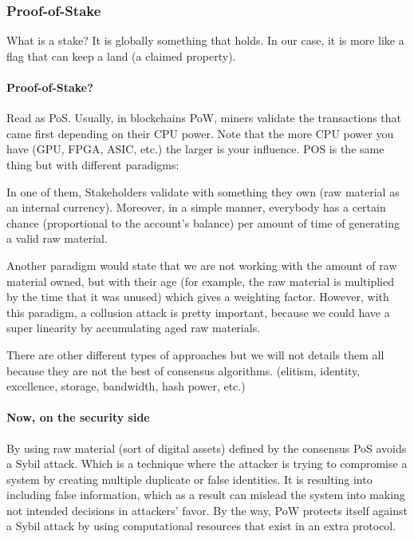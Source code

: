 \subsubsection{Proof-of-Stake}
What is a stake? It is globally something that holds. In our case, it is more like a flag that can keep a land (a claimed property).

\paragraph{Proof-of-Stake?\cite{King2012PPCoin:Proof-of-Stake}}
Read as PoS. Usually, in blockchains PoW, miners validate the transactions that came first depending on their CPU power. Note that the more CPU power you have (GPU, FPGA, ASIC, etc.) the larger is your influence. POS is the same thing but with different paradigms:

In one of them, Stakeholders validate with something they own (raw material as an internal currency). Moreover, in a simple manner, everybody has a certain chance (proportional to the account’s balance) per amount of time of generating a valid raw material.

Another paradigm would state that we are not working with the amount of raw material owned, but with their age (for example, the raw material is multiplied by the time that it was unused) which gives a weighting factor. However, with this paradigm, a collusion attack is pretty important, because we could have a super linearity by accumulating aged raw materials.

There are other different types of approaches but we will not details them all because they are not the best of consensus algorithms. (elitism, identity, excellence, storage, bandwidth, hash power, etc.)

\paragraph{Now, on the security side} By using raw material (sort of digital assets) defined by the consensus PoS avoids a Sybil\cite{G.LawrencePaulSundararaj1D.R.AnitaSofiaLiz22014Anti-SybilNetworks} attack. Which is a technique where the attacker is trying to compromise a system by creating multiple duplicate or false identities. It is resulting into including false information, which as a result can mislead the system into making not intended decisions in attackers' favor. By the way, PoW protects itself against a Sybil attack by using computational resources that exist in an extra protocol.

